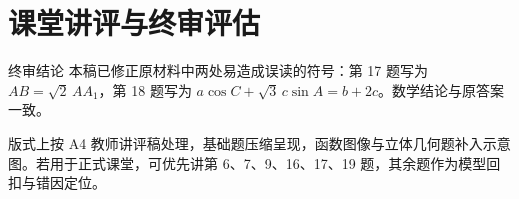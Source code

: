 \documentclass[UTF8,zihao=-4]{ctexart}
\begin{document}
\section{课堂讲评与终审评估}



\begin{warnbox}{终审结论}
本稿已修正原材料中两处易造成误读的符号：第 17 题写为 \(AB=\sqrt2\,AA_1\)，第 18 题写为 \(a\cos C+\sqrt3\,c\sin A=b+2c\)。数学结论与原答案一致。

版式上按 A4 教师讲评稿处理，基础题压缩呈现，函数图像与立体几何题补入示意图。若用于正式课堂，可优先讲第 6、7、9、16、17、19 题，其余题作为模型回扣与错因定位。
\end{warnbox}
\end{document}
